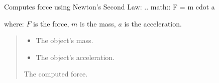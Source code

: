 \documentclass[a4paper,14pt,oneside,english,openany]{sphinxmanual}
\begin{document}
\begin{fulllineitems}
\label{\detokenize{pythagorus:pythagorus.force}}
\pysigstartsignatures
{}
\pysigstopsignatures
\sphinxAtStartPar
Computes force using Newton’s Second Law:
.. math::
F = m cdot a

\sphinxAtStartPar
where:
\sphinxhyphen{} \(F\) is the force,
\sphinxhyphen{} \(m\) is the mass,
\sphinxhyphen{} \(a\) is the acceleration.
\begin{quote}\begin{description}
\begin{itemize}
\item {} 
\sphinxAtStartPar
{} \textendash{} The object’s mass.

\item {} 
\sphinxAtStartPar
{} \textendash{} The object’s acceleration.

\end{itemize}

\sphinxAtStartPar
The computed force.

\end{description}\end{quote}

\end{fulllineitems}

\end{document}
